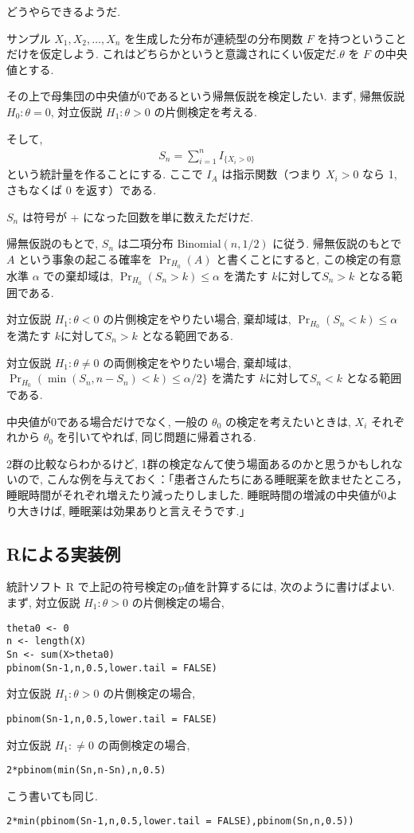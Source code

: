 \documentclass[12pt]{jsarticle}
\begin{document}
どうやらできるようだ.

サンプル $X_1, X_2, \ldots, X_n$ を生成した分布が連続型の分布関数 $F$ を持つということだけを仮定しよう. これはどちらかというと意識されにくい仮定だ.$\theta$ を $F$ の中央値とする. 

その上で母集団の中央値が0であるという帰無仮説を検定したい. 
まず, 帰無仮説 $H_0: \theta = 0$, 対立仮説 $H_1: \theta > 0$ の片側検定を考える.

そして, 
\begin{align}
S_n = \sum_{i=1}^{n} I_{\{X_i > 0\}}
\end{align}
という統計量を作ることにする. ここで $I_A$ は指示関数（つまり $X_i > 0$ なら 1, さもなくば 0 を返す）である. 

$S_n$ は符号が + になった回数を単に数えただけだ. 

帰無仮説のもとで, $S_n$ は二項分布 $\mathrm{Binomial}(n, 1/2)$ に従う.
帰無仮説のもとで $A$ という事象の起こる確率を $\Pr_{H_0}(A)$ と書くことにすると, この検定の有意水準 $\alpha$ での棄却域は, $\Pr_{H_0}(S_n>k)\le\alpha$ を満たす $k$に対して$S_n>k$ となる範囲である.

対立仮説 $H_1: \theta < 0$ の片側検定をやりたい場合, 棄却域は, $\Pr_{H_0}(S_n<k)\le\alpha$ を満たす $k$に対して$S_n>k$ となる範囲である.

対立仮説 $H_1: \theta \neq 0$ の両側検定をやりたい場合, 棄却域は, $\Pr_{H_0}(\min(S_n,n-S_n)<k)\le\alpha/2\}$ を満たす $k$に対して$S_n<k$ となる範囲である.

中央値が0である場合だけでなく, 一般の $\theta_0$ の検定を考えたいときは, $X_i$ それぞれから $\theta_0$ を引いてやれば, 同じ問題に帰着される. 

2群の比較ならわかるけど, 1群の検定なんて使う場面あるのかと思うかもしれないので, こんな例を与えておく：「患者さんたちにある睡眠薬を飲ませたところ，　睡眠時間がそれぞれ増えたり減ったりしました. 睡眠時間の増減の中央値が0より大きけば, 睡眠薬は効果ありと言えそうです.」

\subsection{Rによる実装例}

統計ソフト R で上記の符号検定のp値を計算するには, 次のように書けばよい.
まず, 対立仮説 $H_1: \theta > 0$ の片側検定の場合,
\begin{verbatim}
theta0 <- 0
n <- length(X)
Sn <- sum(X>theta0)
pbinom(Sn-1,n,0.5,lower.tail = FALSE)
\end{verbatim}
対立仮説 $H_1: \theta > 0$ の片側検定の場合, 
\begin{verbatim}
pbinom(Sn-1,n,0.5,lower.tail = FALSE)
\end{verbatim}
対立仮説 $H_1: \neq  0$ の両側検定の場合, 
\begin{verbatim}
2*pbinom(min(Sn,n-Sn),n,0.5)
\end{verbatim}
こう書いても同じ.
\begin{verbatim}
2*min(pbinom(Sn-1,n,0.5,lower.tail = FALSE),pbinom(Sn,n,0.5))
\end{verbatim}
\end{document}
